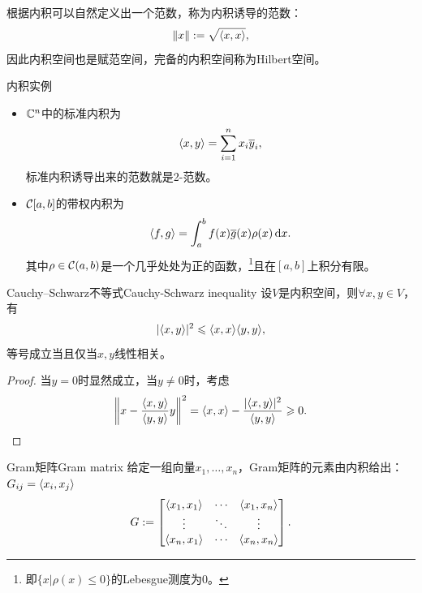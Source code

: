 \begin{corollary}
    根据内积可以自然定义出一个范数，称为内积诱导的范数：
    \begin{equation}
        \lVert x\rVert := \sqrt{\langle x,x\rangle},
    \end{equation}
    因此内积空间也是赋范空间，完备的内积空间称为Hilbert空间。
\end{corollary}

\begin{example}
    {内积实例}{}
    \begin{itemize}
        \item $\mathbb{C}^n$中的标准内积为
        \begin{equation}\label{eq:na-complex-inner-product}
            \langle x,y\rangle = \sum_{i=1}^nx_i\overline y_i,
        \end{equation}
        标准内积诱导出来的范数就是2-范数。
        \item $\mathcal{C}[a,b]$的带权内积为 
        \begin{equation}\label{eq:na-weighted-inner-product}
            \langle f,g\rangle = \int_a^bf(x)\overline g(x)\rho(x)\mathop{}\!\mathrm{d} x.
        \end{equation}
        其中$\rho \in \mathcal{C}(a,b)$是一个几乎处处为正的函数，\footnote{即$\{x|\rho(x) \leq 0\}$的Lebesgue测度为0。}且在$[a,b]$上积分有限。
    \end{itemize}
\end{example}

\begin{theorem}
    {Cauchy--Schwarz不等式}{Cauchy-Schwarz inequality}
    设$V$是内积空间，则$\forall x,y \in V$，有
    \begin{equation}
        \lvert\langle x,y\rangle\rvert^2 \leqslant \langle x,x\rangle\langle y,y\rangle,
    \end{equation}
    等号成立当且仅当$x,y$线性相关。
\end{theorem}

\begin{proof}
    当$y = 0$时显然成立，当$y \neq 0$时，考虑
    \[
        \biggl\lVert x - \frac{\langle x,y\rangle}{\langle y,y\rangle}y\biggr\rVert^2 = \langle x,x\rangle - \frac{\lvert\langle x,y\rangle\rvert^2}{\langle y,y\rangle} \geqslant 0.
        \qedhere
    \]
\end{proof}

\begin{definition}
    {Gram矩阵}{Gram matrix}
    给定一组向量$x_1,\ldots,x_n$，Gram矩阵的元素由内积给出：$G_{ij} = \langle x_i,x_j\rangle$
    \begin{equation}
        G := \begin{bmatrix}
            \langle x_1,x_1\rangle&\cdots&\langle x_1,x_n\rangle\\
            \vdots&\ddots&\vdots\\
            \langle x_n,x_1\rangle&\cdots&\langle x_n,x_n\rangle
        \end{bmatrix}.
    \end{equation}
\end{definition}

